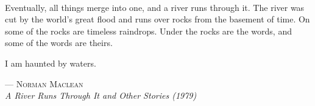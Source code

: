 \newpage~
\thispagestyle{empty}
\cleardoublepage
\thispagestyle{plain}
{
\hfill
\begin{minipage}{8cm}
\setlength{\parskip}{0.5em}
\raggedleft
\sffamily
\small
Eventually, all things merge into one,
and a river runs through it.
The river was cut by the world's great flood
and runs over rocks from the basement of time.
On some of the rocks are timeless raindrops.
Under the rocks are the words,
and some of the words are theirs.

\bigskip

I am haunted by waters.

\bigskip

\small
--- \textsc{Norman Maclean}\\\emph{A River Runs Through It and Other Stories (1979)}
\end{minipage}
}